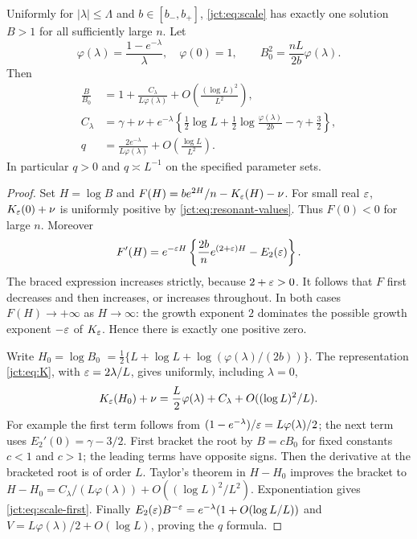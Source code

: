 \begin{theorem}
\label{jct:thm:scale}
Uniformly for $|\lambda|\le\Lambda$ and $b\in[b_-,b_+]$,
\eqref{jct:eq:scale} has exactly one solution $B>1$ for all sufficiently
large $n$. Let
\begin{equation}\label{jct:eq:leading-scale}
 \varphi(\lambda)=\frac{1-e^{-\lambda}}{\lambda},\quad \varphi(0)=1,
 \qquad B_0^2=\frac{nL}{2b}\varphi(\lambda).
\end{equation}
Then
\begin{align}
 \frac B{B_0}
 &=1+\frac{C_\lambda}{L\varphi(\lambda)}
       +O\left(\frac{(\log L)^2}{L^2}\right),\label{jct:eq:scale-first}\\
 C_\lambda
 &=\gamma+\nu+e^{-\lambda}
   \left\{\frac12\log L+\frac12\log\frac{\varphi(\lambda)}{2b}
                   -\gamma+\frac32\right\},\label{jct:eq:C-lambda}\\
 q&=\frac{2e^{-\lambda}}{L\varphi(\lambda)}
          +O\left(\frac{\log L}{L^2}\right).
          \label{jct:eq:q-equivalent}
\end{align}
In particular $q>0$ and $q\asymp L^{-1}$ on the specified parameter sets.
\end{theorem}

\begin{proof}
Set $H=\log B$ and
$F(H)=be^{2H}/n-K_\varepsilon(H)-\nu$. For small real $\varepsilon$,
$K_\varepsilon(0)+\nu$ is uniformly positive by
\eqref{jct:eq:resonant-values}. Thus $F(0)<0$ for large $n$.
Moreover
\[
 F'(H)=e^{-\varepsilon H}
 \left\{\frac{2b}{n}e^{(2+\varepsilon)H}-E_2(\varepsilon)\right\}.
\]
The braced expression increases strictly, because $2+\varepsilon>0$.
It follows that $F$ first decreases and then increases, or increases
throughout. In both cases $F(H)\to+\infty$ as $H\to\infty$:
the growth exponent $2$ dominates the possible growth exponent
$-\varepsilon$ of $K_\varepsilon$. Hence there is exactly one positive zero.

Write $H_0=\log B_0$
$=\tfrac12\{L+\log L+\log(\varphi(\lambda)/(2b))\}$.
The representation \eqref{jct:eq:K}, with
$\varepsilon=2\lambda/L$, gives uniformly, including $\lambda=0$,
\[
 K_\varepsilon(H_0)+\nu
 =\frac L2\varphi(\lambda)+C_\lambda
                   +O((\log L)^2/L).
\]
For example the first term follows from
$(1-e^{-\lambda})/\varepsilon=L\varphi(\lambda)/2$; the next term uses
$E_2'(0)=\gamma-3/2$. First bracket the root by $B=cB_0$
for fixed constants $c<1$ and $c>1$; the leading terms have opposite
signs. Then the derivative at the bracketed root is of order $L$.
Taylor's theorem in $H-H_0$ improves the bracket to
$H-H_0=C_\lambda/(L\varphi(\lambda))+O((\log L)^2/L^2)$.
Exponentiation gives \eqref{jct:eq:scale-first}. Finally
$E_2(\varepsilon)B^{-\varepsilon}=e^{-\lambda}(1+O(\log L/L))$
and $V=L\varphi(\lambda)/2+O(\log L)$, proving the $q$ formula.
\end{proof}

